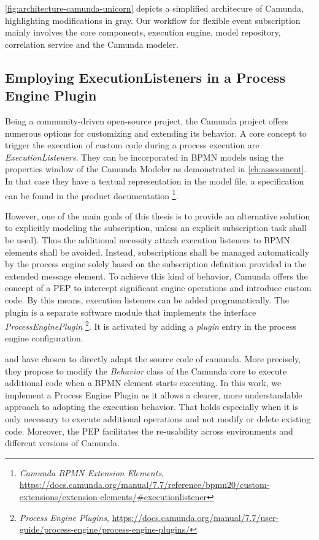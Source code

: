 \autoref{fig:architecture-camunda-unicorn} depicts a simplified architecure of Camunda, highlighting modifications in gray.
Our workflow for flexible event subscription mainly involves the core components, execution engine, model repository, correlation service and the Camunda modeler.

\subsection{Employing ExecutionListeners in a Process Engine Plugin}
Being a community-driven open-source project, the Camunda project offers numerous options for customizing and extending its behavior.
A core concept to trigger the execution of custom code during a process execution are \textit{ExecutionListeners}.
They can be incorporated in BPMN models using the properties window of the Camunda Modeler as demonstrated in \autoref{ch:assessment}. In that case they have a textual representation in the model file, a specification can be found in the product documentation
\footnote{\textit{Camunda BPMN Extension Elements}, \url{https://docs.camunda.org/manual/7.7/reference/bpmn20/custom-extensions/extension-elements/\#executionlistener}}.

However, one of the main goals of this thesis is to provide an alternative solution to explicitly modeling the subscription, unless an explicit subscription task shall be used). Thus the additional necessity attach execution listeners to BPMN elements shall be avoided.
Instead, subscriptions shall be managed automatically by the process engine solely based on the subscription definition provided in the extended message element.
To achieve this kind of behavior, Camunda offers the concept of a \ac{PEP} to intercept significant engine operations and introduce custom code. 
By this means, execution listeners can be added programatically.
The plugin is a separate software module that implements the interface \textit{ProcessEnginePlugin}
\footnote{\textit{Process Engine Plugins}, \url{https://docs.camunda.org/manual/7.7/user-guide/process-engine/process-engine-plugins/}}.
It is activated by adding a \textit{plugin} entry in the process engine configuration.

\cite{mandal:2017} and \cite{Pufahl2017} have chosen to directly adapt the source code of camunda. More precisely, they propose to modify the \textit{Behavior} class of the Camunda core to execute additional code when a BPMN element starts executing.
In this work, we implement a Process Engine Plugin as it allows a clearer, more understandable approach to adopting the execution behavior. 
That holds especially when it is only necessary to execute additional operations and not modify or delete existing code.
Moreover, the PEP facilitates the re-usability across environments and different versions of Camunda.

